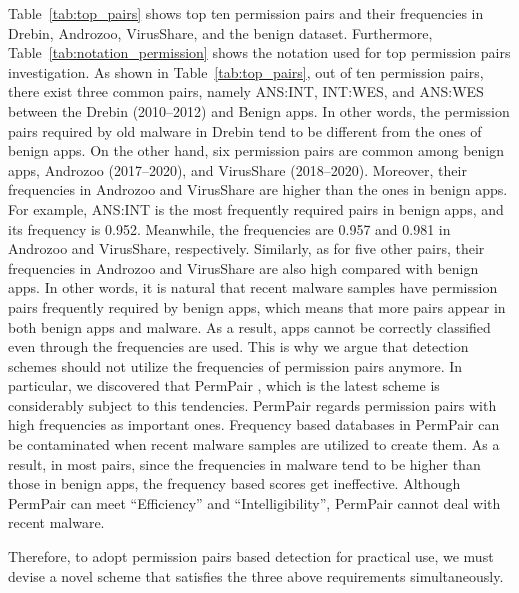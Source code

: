 \documentclass{ieeeaccess}
\newcommand{\mytablename}{Table}
\begin{document}
\mytablename~\ref{tab:top_pairs} shows top ten permission pairs and their frequencies in Drebin, Androzoo, VirusShare, and the benign dataset.
Furthermore, \mytablename~\ref{tab:notation_permission} shows the notation used for top permission pairs investigation.
As shown in \mytablename~\ref{tab:top_pairs}, out of ten permission pairs, there exist three common pairs, namely ANS:INT, INT:WES, and ANS:WES between the Drebin (2010--2012) and Benign apps.
In other words, the permission pairs required by old malware in Drebin tend to be different from the ones of benign apps.
On the other hand, six permission pairs are common among benign apps, Androzoo (2017--2020), and VirusShare (2018--2020).
Moreover, their frequencies in Androzoo and VirusShare are higher than the ones in benign apps.
For example, ANS:INT is the most frequently required pairs in benign apps, and its frequency is 0.952.
Meanwhile, the frequencies are 0.957 and 0.981 in Androzoo and VirusShare, respectively.
Similarly, as for five other pairs, their frequencies in Androzoo and VirusShare are also high compared with benign apps.
In other words, it is natural that recent malware samples have permission pairs frequently required by benign apps, which means that more pairs appear in both benign apps and malware. 
As a result, apps cannot be correctly classified even through the frequencies are used.
This is why we argue that detection schemes should not utilize the frequencies of permission pairs anymore.  
In particular, we discovered that PermPair \cite{arora2019permpair}, which is the latest scheme is considerably subject to this tendencies.
PermPair regards permission pairs with high frequencies as important ones.
Frequency based databases in PermPair can be contaminated when recent malware samples are utilized to create them.
As a result, in most pairs, since the frequencies in malware tend to be higher than those in benign apps, the frequency based scores get ineffective.
Although PermPair can meet ``Efficiency'' and ``Intelligibility'', PermPair cannot deal with recent malware.

Therefore, to adopt permission pairs based detection for practical use, we must devise a novel scheme that satisfies the three above requirements simultaneously.
\end{document}
